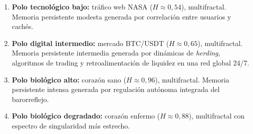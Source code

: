 \begin{enumerate}[leftmargin=2em]
    \item \textbf{Polo tecnológico bajo:} tráfico web NASA ($H \approx 0{,}54$),
          multifractal. Memoria persistente modesta generada por correlación
          entre usuarios y cachés.
    \item \textbf{Polo digital intermedio:} mercado BTC/USDT ($H \approx 0{,}65$),
          multifractal. Memoria persistente intermedia generada por dinámicas
          de \textit{herding}, algoritmos de trading y retroalimentación de
          liquidez en una red global 24/7.
    \item \textbf{Polo biológico alto:} corazón sano ($H \approx 0{,}96$),
          multifractal. Memoria persistente intensa generada por regulación
          autónoma integrada del barorreflejo.
    \item \textbf{Polo biológico degradado:} corazón enfermo ($H \approx 0{,}88$),
          multifractal con espectro de singularidad más estrecho.
\end{enumerate}

